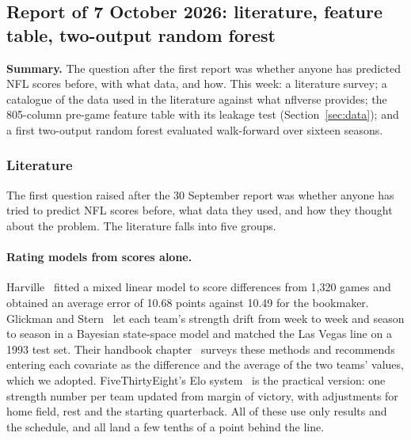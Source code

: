 \documentclass[11pt]{article}
\begin{document}
\subsection{Report of 7 October 2026: literature, feature table, two-output random forest}\label{sec:w1007}

\textbf{Summary.} The question after the first report was whether anyone has predicted NFL scores before, with what data, and how. This week: a literature survey; a catalogue of the data used in the literature against what nflverse provides; the 805-column pre-game feature table with its leakage test (Section~\ref{sec:data}); and a first two-output random forest evaluated walk-forward over sixteen seasons.

\subsubsection{Literature}\label{sec:literature}


The first question raised after the 30 September report was whether anyone has tried to predict NFL scores before, what data they used, and how they thought about the problem. The literature falls into five groups.

\paragraph{Rating models from scores alone.} Harville~\cite{harville1980} fitted a mixed linear model to score differences from 1,320 games and obtained an average error of 10.68 points against 10.49 for the bookmaker. Glickman and Stern~\cite{glickmanstern1998} let each team's strength drift from week to week and season to season in a Bayesian state-space model and matched the Las Vegas line on a 1993 test set. Their handbook chapter~\cite{glickmanstern2017} surveys these methods and recommends entering each covariate as the difference and the average of the two teams' values, which we adopted. FiveThirtyEight's Elo system~\cite{fivethirtyeightelo} is the practical version: one strength number per team updated from margin of victory, with adjustments for home field, rest and the starting quarterback. All of these use only results and the schedule, and all land a few tenths of a point behind the line.
\end{document}

